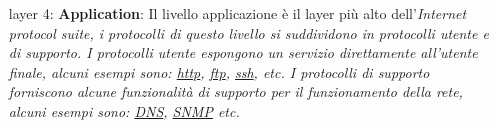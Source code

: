 \begin{enumerate} %
    \item[layer 4:] \textbf{Application}: Il livello applicazione è il layer pi\`u alto dell'\it{Internet protocol suite}, i protocolli di questo livello si suddividono in protocolli utente e di supporto. \newline
        I protocolli utente espongono un servizio direttamente all'utente finale, alcuni esempi sono: \href{https://en.wikipedia.org/wiki/Hypertext_Transfer_Protocol}{http}, \href{https://en.wikipedia.org/wiki/File_Transfer_Protocol}{ftp}, \href{https://en.wikipedia.org/wiki/Secure_Shell}{ssh}, etc. \newline
        I protocolli di supporto forniscono alcune funzionalità di supporto per il funzionamento della rete, alcuni esempi sono: \href{https://en.wikipedia.org/wiki/Domain_Name_System}{DNS}, \href{https://en.wikipedia.org/wiki/Simple_Network_Management_Protocol}{SNMP} etc.

\end{enumerate}

